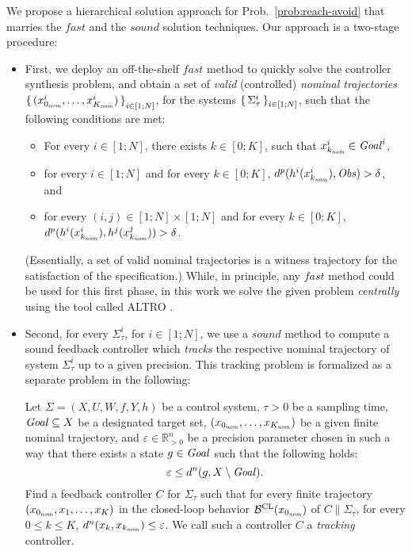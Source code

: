 We propose a hierarchical solution approach for Prob.~\ref{prob:reach-avoid} that marries the $\mathit{fast}$ and the $\mathit{sound}$ solution techniques.
Our approach is a two-stage procedure: 
\begin{itemize}
	\item First, we deploy an off-the-shelf $\mathit{fast}$ method to quickly solve the controller synthesis problem, and obtain a set of  \emph{valid} (controlled) \emph{nominal trajectories} $\set{(x_{0_{\mathit{nom}}}^i,\ldots,x_{K_{\mathit{nom}}}^i)}_{i\in [1;N]}$, for the systems $\set{\Sigma_\tau^i}_{i\in [1;N]}$, such that the following conditions are met:
	\begin{itemize}
		\item For every $i\in [1;N]$, there exists $k\in [0;K]$, such that $x_{k_{\mathit{nom}}}^i\in \mathit{Goal}^i$,
		\item for every $i\in [1;N]$ and for every $k\in [0;K]$, $d^{p}(h^i(x_{k_{\mathit{nom}}}^i),\mathit{Obs}) > \delta$, and
		\item for every $(i,j)\in [1;N]\times [1;N]$ and for every $k\in [0;K]$, $d^{p}(h^i(x_{k_{\mathit{nom}}}^i), h^j(x_{k_{\mathit{nom}}}^j)) > \delta$. 
	\end{itemize}
	(Essentially, a set of valid nominal trajectories is a witness trajectory for the satisfaction of the specification.)
	While, in principle, any $\mathit{fast}$ method could be used for this first phase, in this work we solve the given problem \emph{centrally} using the tool called ALTRO \cite{howell2019altro}.
	\item Second, for every $\Sigma^i_\tau$, for $i\in [1;N]$, we use a $\mathit{sound}$ method to compute a sound feedback controller which \emph{tracks} the respective nominal trajectory of system $\Sigma^i_\tau$ up to a given precision.
This tracking problem is formalized as a separate problem in the following:
		\begin{problem}\label{prob:tracking_with_time}
			Let $\Sigma=(X,U,W,f,Y,h)$ be a control system, $\tau>0$ be a sampling time, $\mathit{Goal}\subseteq X$ be a designated target set, $(x_{0_{\mathit{nom}}},\ldots,x_{K_{\mathit{nom}}})$ be a given finite nominal trajectory, and $\varepsilon\in \mathbb{R}^{n}_{>0}$ be a precision parameter chosen in such a way that there exists a state $g\in \mathit{Goal}$ such that the following holds:
			\begin{equation}\label{eq:choice of eps}
				\varepsilon \leq d^n(g, X\setminus \mathit{Goal}). 
			\end{equation}
			Find a feedback controller $C$ for $\Sigma_\tau$ such that 
			for every finite trajectory $(x_{0_{\mathit{nom}}},x_1,\ldots,x_K)$ in the closed-loop behavior $\mathcal{B}^{\mathrm{CL}}(x_{0_{\mathit{nom}}})$ of $C \parallel \Sigma_\tau$, for every $0\leq k \leq K$, $d^n(x_k, x_{k_{\mathit{nom}}}) \leq \varepsilon$.
			We call such a controller $C$ a \emph{tracking} controller.
		\end{problem}
\end{itemize}

